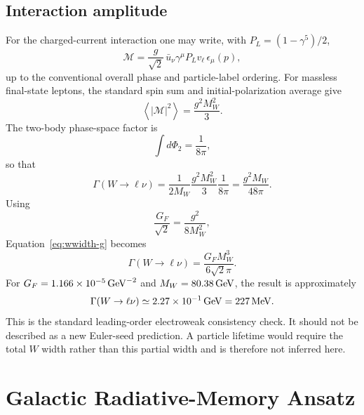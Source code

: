 \documentclass[twocolumn]{aastex631}
\begin{document}
\subsection{Interaction amplitude}
For the charged-current interaction one may write, with $P_L=(1-\gamma^5)/2$,
\begin{equation}
\mathcal M
=\frac{g}{\sqrt2}\,
\bar u_\nu\gamma^\mu P_L v_\ell\,\epsilon_\mu(p),
\end{equation}
up to the conventional overall phase and particle-label ordering. For massless final-state leptons, the standard spin sum and initial-polarization average give
\begin{equation}
\left\langle |\mathcal M|^2\right\rangle
=\frac{g^2M_W^2}{3}.
\end{equation}
The two-body phase-space factor is
\begin{equation}
\int d\Phi_2=\frac{1}{8\pi},
\end{equation}
so that
\begin{equation}
\Gamma(W\to\ell\nu)
=\frac{1}{2M_W}\frac{g^2M_W^2}{3}\frac{1}{8\pi}
=\frac{g^2M_W}{48\pi}.
\label{eq:wwidth-g}
\end{equation}
Using
\begin{equation}
\frac{G_F}{\sqrt2}=\frac{g^2}{8M_W^2},
\end{equation}
Equation~\eqref{eq:wwidth-g} becomes
\begin{equation}
\boxed{\Gamma(W\to\ell\nu)=\frac{G_FM_W^3}{6\sqrt2\pi}}.
\label{eq:wwidth}
\end{equation}
For $G_F=1.166\times10^{-5}\,{\rm GeV}^{-2}$ and $M_W=80.38\,{\rm GeV}$, the result is approximately
\[
\Gamma(W\to\ell\nu)\simeq2.27\times10^{-1}\,{\rm GeV}=227\,{\rm MeV}.
\]
This is the standard leading-order electroweak consistency check. It should not be described as a new Euler-seed prediction. A particle lifetime would require the total $W$ width rather than this partial width and is therefore not inferred here.

\section{Galactic Radiative-Memory Ansatz}
\end{document}
